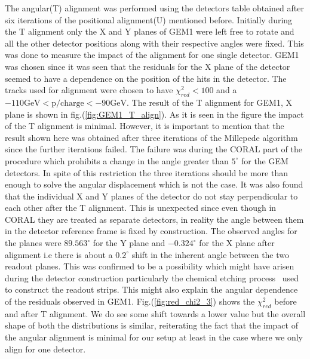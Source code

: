 The angular(T) alignment was performed using the detectors table obtained after six iterations of the positional alignment(U) mentioned before. Initially during the T alignment only the X and Y planes of GEM1 were left free to rotate and all the other detector positions along with their respective angles were fixed. This was done to measure the impact of the alignment for one single detector. GEM1 was chosen since it was seen that the residuals for the X plane of the detector seemed to have a dependence on the position of the hits in the detector. The tracks used for alignment were chosen to have $\chi^2_{red} < 100$ and a $-110 \text{GeV} <\text{p/charge}< -90 \text{GeV}$. The result of the T alignment for GEM1, X plane is shown in fig.(\ref{fig:GEM1_T_align}). As it is seen in the figure the impact of the T alignment is minimal. However, it is important to mention that the result shown here was obtained after three iterations of the Millepede algorithm since the further iterations failed. The failure was during the CORAL part of the procedure which prohibits a change in the angle greater than $5^{\circ}$ for the GEM detectors. In spite of this restriction the three iterations should be more than enough to solve the angular displacement which is not the case. It was also found that the individual X and Y planes of the detector do not stay perpendicular to each other after the T alignment. This is unexpected since even though in CORAL they are treated as separate detectors, in reality the angle between them in the detector reference frame is fixed by construction. The observed angles for the planes were $89.563^{\circ}$ for the Y plane and $-0.324^{\circ}$ for the X plane after alignment i.e there is about a $0.2^{\circ}$ shift in the inherent angle between the two readout planes. This was confirmed to be a possibility which might have arisen during the detector construction particularly the chemical etching process~\cite{SAULI20162} used to construct the readout strips. This might also explain the angular dependence of the residuals observed in GEM1. Fig.(\ref{fig:red_chi2_3}) shows the $\chi^2_{red}$ before and after T alignment. We do see some shift towards a lower value but the overall shape of both the distributions is similar, reiterating the fact that the impact of the angular alignment is minimal for our setup at least in the case where we only align for one detector.

